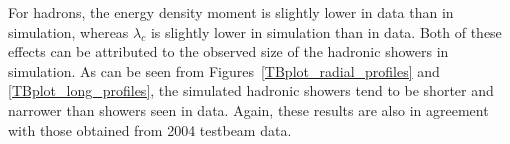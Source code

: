 For hadrons, the energy density moment is slightly lower in data than in simulation, whereas $\lambda_c$ is slightly lower in simulation than in data. Both of these effects can be attributed to the observed size of the hadronic showers in simulation. As can be seen from Figures~\ref{TBplot_radial_profiles} and \ref{TBplot_long_profiles}, the simulated hadronic showers tend to be shorter and narrower than showers seen in data. Again, these results are also in agreement with those obtained from 2004 testbeam data\cite{nim_tbp}. 

%
%


